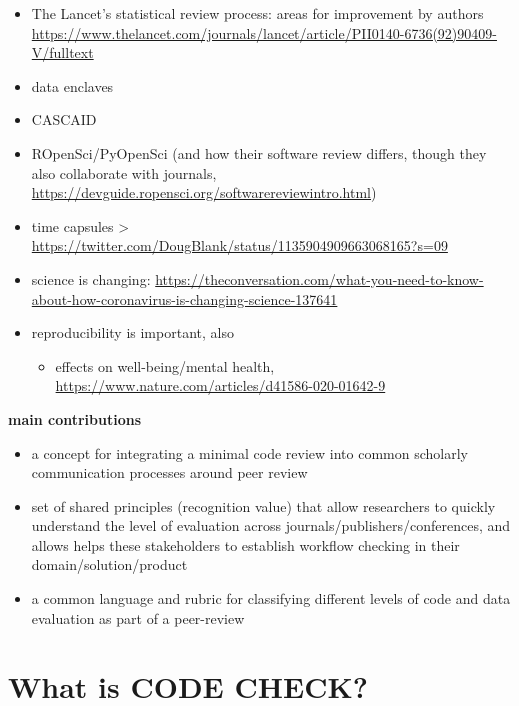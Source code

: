\documentclass[12pt]{article}
\begin{document}
\clearpage
\begin{itemize}
\item
  The Lancet's statistical review process: areas for improvement by authors
  \url{https://www.thelancet.com/journals/lancet/article/PII0140-6736(92)90409-V/fulltext}
\item
  data enclaves
\item
  CASCAID
\item
  ROpenSci/PyOpenSci (and how their software review differs, though they
  also collaborate with journals,
  \url{https://devguide.ropensci.org/softwarereviewintro.html})
\item
  time capsules \textgreater{}
  \url{https://twitter.com/DougBlank/status/1135904909663068165?s=09}
\item
  science is changing:
  \url{https://theconversation.com/what-you-need-to-know-about-how-coronavirus-is-changing-science-137641}
\item
  reproducibility is important, also

  \begin{itemize}
  \item
    effects on well-being/mental health,
    \url{https://www.nature.com/articles/d41586-020-01642-9}
  \end{itemize}
\end{itemize}

\textbf{main contributions}

\begin{itemize}
\item
  a concept for integrating a minimal code review into common scholarly
  communication processes around peer review
\item
  set of shared principles (recognition value) that allow researchers to
  quickly understand the level of evaluation across
  journals/publishers/conferences, and allows helps these stakeholders
  to establish workflow checking in their domain/solution/product
\item
  a common language and rubric for classifying different levels of code
  and data evaluation as part of a peer-review
\end{itemize}

\section*{What is CODE CHECK?}\label{what-is-code-check}
\end{document}
